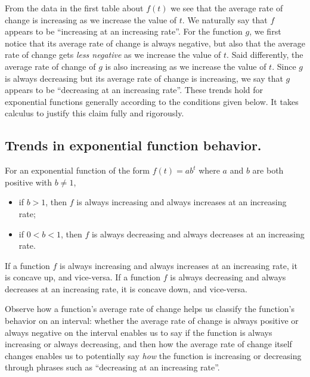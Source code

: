 \documentclass[nooutcomes]{ximera}
\begin{document}
From the data in the first table about $f(t)$ we see that the average rate of change is increasing as we increase the value of $t$.  We naturally say that $f$ appears to be ``increasing at an increasing rate''.  For the function $g$, we first notice that its average rate of change is always negative, but also that the average rate of change gets \emph{less negative} as we increase the value of $t$. Said differently, the average rate of change of $g$ is also increasing as we increase the value of $t$.  Since $g$ is always decreasing but its average rate of change is increasing, we say that $g$ appears to be ``decreasing at an increasing rate''.  These trends hold for exponential functions generally according to the conditions given below.  It takes calculus to justify this claim fully and rigorously. 

\begin{callout}
\section{Trends in exponential function behavior.}
For an exponential function of the form $f(t) = ab^t$ where $a$ and $b$ are both positive with $b \ne 1$,\leavevmode%
\begin{itemize}[label=\textbullet]
\item{}\hypertarget{p-1228}{}%
if $b > 1$, then $f$ is always increasing and always increases at an increasing rate;%
\item{}\hypertarget{p-1229}{}%
if $0 < b < 1$, then $f$ is always decreasing and always decreases at an increasing rate.%
\end{itemize}
\end{callout}

\begin{theorem}
If a function $f$ is always increasing and always increases at an increasing rate, it is concave up, and vice-versa. If a function $f$ is always decreasing and always decreases at an increasing rate, it is concave down, and vice-versa. 
\end{theorem}

Observe how a function's average rate of change helps us classify the function's behavior on an interval:  whether the average rate of change is always positive or always negative on the interval enables us to say if the function is always increasing or always decreasing, and then how the average rate of change itself changes enables us to potentially say \emph{how} the function is increasing or decreasing through phrases such as ``decreasing at an increasing rate''.
\end{document}
